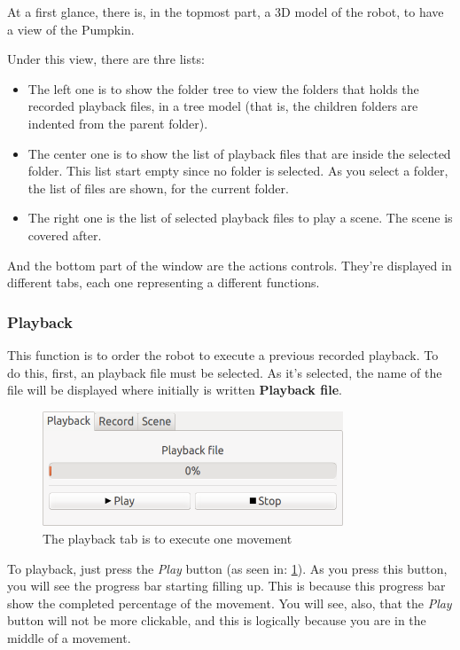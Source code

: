 \documentclass[oneside,a4paper,titlepage]{article}
\begin{document}
At a first glance, there is, in the topmost part, a 3D model of the robot, to have a view of the Pumpkin.

Under this view, there are thre lists:

\begin{itemize}
	\item The left one is to show the folder tree to view the folders that holds the recorded playback files, in a tree model (that is, the children folders are indented from the parent folder).

	\item The center one is to show the list of playback files that are inside the selected folder. This list start empty since no folder is selected. As you select a folder, the list of files are shown, for the current folder.
	
	\item The right one is the list of selected playback files to play a scene. The scene is covered after.
\end{itemize}

And the bottom part of the window are the actions controls. They're displayed in different tabs, each one representing a different functions.

\subsubsection{Playback}
\label{subsec:playback}
	This function is to order the robot to execute a previous recorded playback. To do this, first, an playback file must be selected. As it's selected, the name of the file will be displayed where initially is written \textbf{Playback file}.
	
	\begin{figure}[ht!]
		\centering
		\includegraphics[width=0.8\textwidth]{playback_tab}
		\caption[Playback Tab]{The playback tab is to execute one movement}
		\label{fig:playback_tab}
	\end{figure}
	
	To playback, just press the \emph{Play} button (as seen in: \ref{fig:playback_tab}). As you press this button, you will see the progress bar starting filling up. This is because this progress bar show the completed percentage of the movement. You will see, also, that the \emph{Play} button will not be more clickable, and this is logically because you are in the middle of a movement.
	
\end{document}
